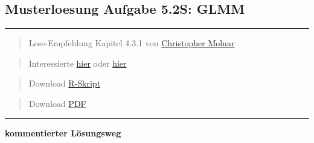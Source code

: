\documentclass[
]{article}
\author{}
\date{\vspace{-2.5em}}
\begin{document}
\hypertarget{musterloesung-aufgabe-5.2s-glmm}{%
\subsection{Musterloesung Aufgabe 5.2S:
GLMM}\label{musterloesung-aufgabe-5.2s-glmm}}

\begin{center}\rule{0.5\linewidth}{0.5pt}\end{center}

\begin{quote}
Lese-Empfehlung Kapitel 4.3.1 von
\href{https://christophm.github.io/interpretable-ml-book/extend-lm.html\#glm}{Christopher
Molnar}
\end{quote}

\begin{quote}
Interessierte
\href{https://rpsychologist.com/r-guide-longitudinal-lme-lmer}{hier}
oder \href{https://rpubs.com/kaz_yos/glmm1}{hier}
\end{quote}

\begin{quote}
Download \href{17_Statistik5/RFiles/solution_stat5.2.R}{R-Skript}
\end{quote}

\begin{quote}
Download \href{17_Statistik5/solution_stat5.2.pdf}{PDF}
\end{quote}

\begin{center}\rule{0.5\linewidth}{0.5pt}\end{center}

\textbf{kommentierter Lösungsweg}
\end{document}

